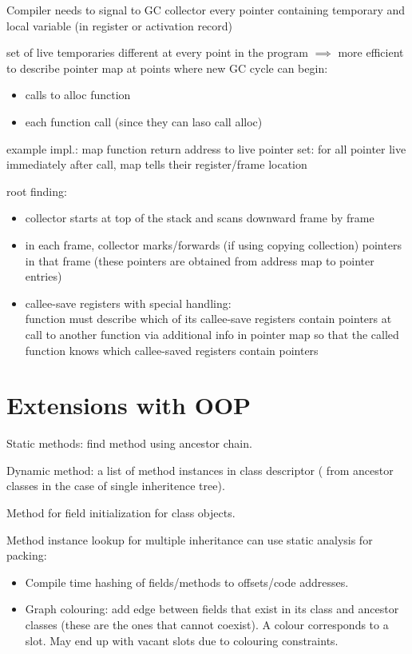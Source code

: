 \documentclass[8pt]{extarticle}
\begin{document}
\begin{multicols*}{2}
  Compiler needs to signal to GC collector every pointer containing temporary and local variable (in register or activation record)

  set of live temporaries different at every point in the program $\implies$ more efficient to describe pointer map at points where new GC cycle can begin:
  \begin{itemize}
  \item calls to alloc function
  \item each function call (since they can laso call alloc)
  \end{itemize}
  example impl.: map function return address to live pointer set: for all pointer live immediately after call, map tells their register/frame location

  root finding:
  \begin{itemize}
  \item collector starts at top of the stack and scans downward frame by frame
  \item in each frame, collector marks/forwards (if using copying collection) pointers in that frame (these pointers are obtained from address map to pointer entries)
  \item callee-save registers with special handling:\\
    function must describe which of its callee-save registers contain pointers at call to another function via additional info in pointer map so that the called function knows which callee-saved registers contain pointers
  \end{itemize}
  
  \vfill\null
  \columnbreak

  \section{Extensions with OOP}

  Static methods: find method using ancestor chain.

  Dynamic method: a list of method instances in class descriptor ( from ancestor classes in the case of single inheritence tree).

  Method for field initialization for class objects.

  Method instance lookup for multiple inheritance can use static analysis for packing:
  \begin{itemize}
  \item Compile time hashing of fields/methods to offsets/code addresses.
  \item Graph colouring: add edge between fields that exist in its class and ancestor classes (these are the ones that cannot coexist). A colour corresponds to a slot. May end up with vacant slots due to colouring constraints.
  \end{itemize}


\end{multicols*}
\end{document}
